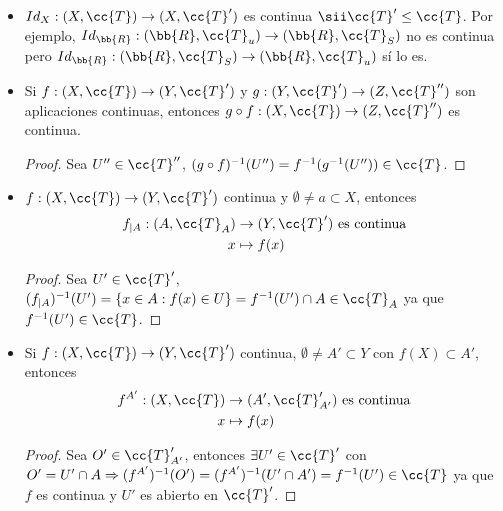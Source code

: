 \begin{observacion}
\begin{itemize}
        \item $Id_X : (X, \cc{T}) \to (X, \cc{T}')$ es continua $\sii \cc{T}' \leq \cc{T}$. Por ejemplo, $Id_{\bb{R}}:(\bb{R}, \cc{T}_u)\to (\bb{R}, \cc{T}_S)$ no es continua pero $Id_{\bb{R}}:(\bb{R}, \cc{T}_S) \to (\bb{R}, \cc{T}_u)$ sí lo es.
        \item Si $f:(X, \cc{T})\to (Y, \cc{T}')$ y $g:(Y, \cc{T}')\to (Z, \cc{T}'')$ son aplicaciones continuas, entonces $g\circ f : (X, \cc{T})\to (Z, \cc{T}'')$ es continua.
        \begin{proof}
            Sea $U''\in \cc{T}''$, $(g\circ f)^{-1}(U'') = f^{-1}(g^{-1}(U''))\in \cc{T}$.
        \end{proof}
        \item $f:(X, \cc{T})\to (Y,\cc{T}')$ continua y $\emptyset\neq a  \subset X$, entonces
        \begin{align*}
            f_{|A}:(A, \cc{T}_A) &\to (Y, \cc{T}') \text{ es continua}\\
            x & \mapsto f(x)
        \end{align*}
        \begin{proof}
            Sea $U'\in \cc{T}'$, $(f_{|A})^{-1}(U') = \{x \in A : f(x)\in U\} = f^{-1}(U') \cap A\in \cc{T}_A$ ya que $f^{-1}(U')\in \cc{T}$.
        \end{proof}
        \item Si $f:(X, \cc{T})\to (Y, \cc{T}')$ continua, $\emptyset \neq A' \subset Y$ con $f(X)\subset A'$, entonces 
        \begin{align*}
            f^{A'}:(X, \cc{T}) &\to (A', \cc{T}_{A'}') \text{ es continua}\\
            x &\mapsto f(x)
        \end{align*}
        \begin{proof}
            Sea $O'\in \cc{T}_{A'}'$, entonces $\exists U'\in \cc{T}'$ con $O'=U'\cap A \Rightarrow (f^{A'})^{-1}(O') = (f^{A'})^{-1}(U'\cap A') = f^{-1}(U')\in \cc{T}$ ya que $f$ es continua y $U'$ es abierto en $\cc{T}'$.
        \end{proof}
    \end{itemize}
\end{observacion}

